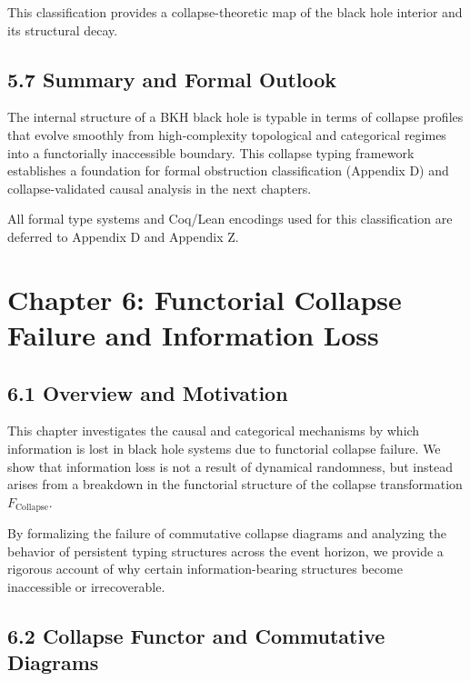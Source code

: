 \documentclass[11pt]{article}
\begin{document}
This classification provides a collapse-theoretic map of the black hole interior and its structural decay.

\subsection*{5.7 Summary and Formal Outlook}

The internal structure of a BKH black hole is typable in terms of collapse profiles that evolve smoothly from high-complexity topological and categorical regimes into a functorially inaccessible boundary. This collapse typing framework establishes a foundation for formal obstruction classification (Appendix D) and collapse-validated causal analysis in the next chapters.

All formal type systems and Coq/Lean encodings used for this classification are deferred to Appendix D and Appendix Z.



\section{Chapter 6: Functorial Collapse Failure and Information Loss}

\subsection*{6.1 Overview and Motivation}

This chapter investigates the causal and categorical mechanisms by which information is lost in black hole systems due to functorial collapse failure. We show that information loss is not a result of dynamical randomness, but instead arises from a breakdown in the functorial structure of the collapse transformation \( F_{\mathrm{Collapse}} \).

By formalizing the failure of commutative collapse diagrams and analyzing the behavior of persistent typing structures across the event horizon, we provide a rigorous account of why certain information-bearing structures become inaccessible or irrecoverable.

\subsection*{6.2 Collapse Functor and Commutative Diagrams}
\end{document}
